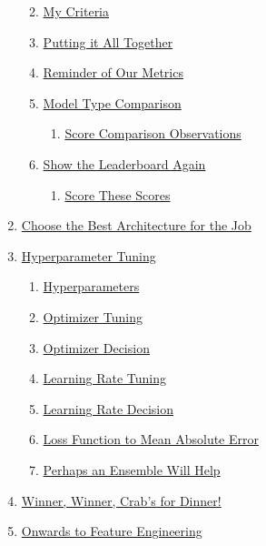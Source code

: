\documentclass[11pt]{article}
\providecommand{\tightlist}{%
      \setlength{\itemsep}{0pt}\setlength{\parskip}{0pt}}
\begin{document}
\begin{enumerate}
  \begin{enumerate}
  \def\labelenumii{\arabic{enumii}.}
  \tightlist
  \item
    \hyperref[my-criteria]{My Criteria}
  \item
    \hyperref[putting-it-all-together]{Putting it All Together}
  \item
    \hyperref[reminder-of-our-metrics]{Reminder of Our Metrics}
  \item
    \hyperref[model-type-comparison]{Model Type Comparison}

    \begin{enumerate}
    \def\labelenumiii{\arabic{enumiii}.}
    \tightlist
    \item
      \hyperref[score-comparison-observations]{Score Comparison Observations}
    \end{enumerate}
  \item
    \hyperref[show-the-leaderboard-again]{Show the Leaderboard Again}

    \begin{enumerate}
    \def\labelenumiii{\arabic{enumiii}.}
    \tightlist
    \item
      \hyperref[score-these-scores]{Score These Scores}
    \end{enumerate}
  \end{enumerate}
\item
  \hyperref[choose-the-best-architecture-for-the-job]{Choose the Best Architecture for the Job}
\item
  \hyperref[hyperparameter-tuning]{Hyperparameter Tuning}

  \begin{enumerate}
  \def\labelenumii{\arabic{enumii}.}
  \tightlist
  \item
    \hyperref[hyperparameters]{Hyperparameters}
  \item
    \hyperref[optimizer-tuning]{Optimizer Tuning}
  \item
    \hyperref[optimizer-decision]{Optimizer Decision}
  \item
    \hyperref[learning-rate-tuning]{Learning Rate Tuning}
  \item
    \hyperref[learning-rate-decision]{Learning Rate Decision}
  \item
    \hyperref[loss-function-to-mean-absolute-error]{Loss Function to Mean Absolute Error}
  \item
    \hyperref[perhaps-an-ensemble-will-help]{Perhaps an Ensemble Will Help}
  \end{enumerate}
\item
  \hyperref[winner-winner-crabs-for-dinner]{Winner, Winner, Crab’s for Dinner!}
\item
  \hyperref[onwards-to-feature-engineering]{Onwards to Feature Engineering}
\end{enumerate}
\end{document}
